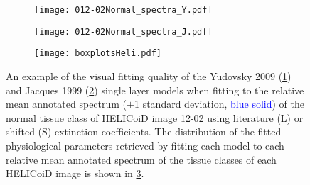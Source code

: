 \begin{figure}[h!]
    \centering
    \begin{subfigure}{0.49\textwidth}
        \texttt{[image: 012-02Normal\_spectra\_Y.pdf]}
        \caption{}
        \label{fig:backwardsHSIHeliY}
    \end{subfigure}
    \begin{subfigure}{0.49\textwidth}
        \texttt{[image: 012-02Normal\_spectra\_J.pdf]}
        \caption{}
        \label{fig:backwardsHSIHeliJ}
    \end{subfigure}
    \begin{subfigure}{\textwidth}
        \texttt{[image: boxplotsHeli.pdf]}
        \caption{}
        \label{fig:boxplotsHeli}
    \end{subfigure}
    \caption{An example of the visual fitting quality of the Yudovsky 2009 (\ref{fig:backwardsHSIHeliY}) and Jacques 1999 (\ref{fig:backwardsHSIHeliJ}) single layer models when fitting to the relative mean annotated spectrum ($\pm$1 standard deviation, \textcolor{blue}{blue solid}) of the normal tissue class of HELICoiD image 12-02 using literature (L) or shifted (S) extinction coefficients. The distribution of the fitted physiological parameters retrieved by fitting each model to each relative mean annotated spectrum of the tissue classes of each HELICoiD image is shown in \ref{fig:boxplotsHeli}.}
    \label{fig:HELICoiDann}
\end{figure}


